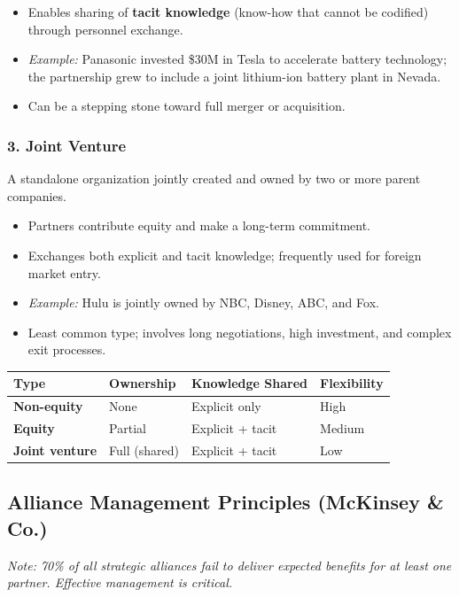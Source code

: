 \documentclass[11pt, letterpaper]{article}
\begin{document}
\begin{itemize}[leftmargin=*]
  \item Enables sharing of \textbf{tacit knowledge} (know-how that cannot be codified) through personnel exchange.
  \item \textit{Example:} Panasonic invested \$30M in Tesla to accelerate battery technology; the partnership grew to include a joint lithium-ion battery plant in Nevada.
  \item Can be a stepping stone toward full merger or acquisition.
\end{itemize}

\subsubsection{3. Joint Venture}
A standalone organization jointly created and owned by two or more parent companies.

\begin{itemize}[leftmargin=*]
  \item Partners contribute equity and make a long-term commitment.
  \item Exchanges both explicit and tacit knowledge; frequently used for foreign market entry.
  \item \textit{Example:} Hulu is jointly owned by NBC, Disney, ABC, and Fox.
  \item Least common type; involves long negotiations, high investment, and complex exit processes.
\end{itemize}

\begin{center}
\begin{tabular}{>{\bfseries}p{3cm} p{2.5cm} p{3cm} p{4cm}}
\toprule
Type & Ownership & Knowledge Shared & Flexibility \\
\midrule
Non-equity & None & Explicit only & High \\
Equity & Partial & Explicit + tacit & Medium \\
Joint venture & Full (shared) & Explicit + tacit & Low \\
\bottomrule
\end{tabular}
\end{center}

\subsection{Alliance Management Principles (McKinsey \& Co.)}

\textit{Note: 70\% of all strategic alliances fail to deliver expected benefits for at least one partner. Effective management is critical.}
\end{document}

